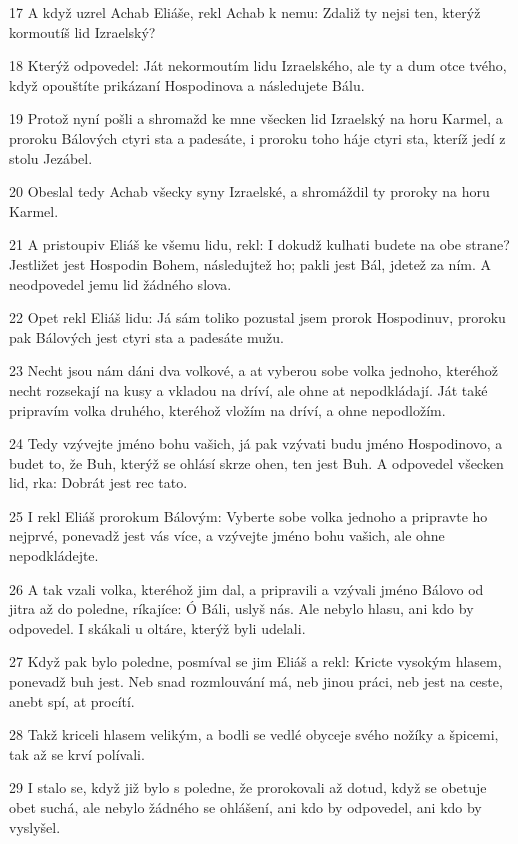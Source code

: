 \par 17 A když uzrel Achab Eliáše, rekl Achab k nemu: Zdaliž ty nejsi ten, kterýž kormoutíš lid Izraelský?
\par 18 Kterýž odpovedel: Ját nekormoutím lidu Izraelského, ale ty a dum otce tvého, když opouštíte prikázaní Hospodinova a následujete Bálu.
\par 19 Protož nyní pošli a shromažd ke mne všecken lid Izraelský na horu Karmel, a proroku Bálových ctyri sta a padesáte, i proroku toho háje ctyri sta, kteríž jedí z stolu Jezábel.
\par 20 Obeslal tedy Achab všecky syny Izraelské, a shromáždil ty proroky na horu Karmel.
\par 21 A pristoupiv Eliáš ke všemu lidu, rekl: I dokudž kulhati budete na obe strane? Jestližet jest Hospodin Bohem, následujtež ho; pakli jest Bál, jdetež za ním. A neodpovedel jemu lid žádného slova.
\par 22 Opet rekl Eliáš lidu: Já sám toliko pozustal jsem prorok Hospodinuv, proroku pak Bálových jest ctyri sta a padesáte mužu.
\par 23 Necht jsou nám dáni dva volkové, a at vyberou sobe volka jednoho, kteréhož necht rozsekají na kusy a vkladou na dríví, ale ohne at nepodkládají. Ját také pripravím volka druhého, kteréhož vložím na dríví, a ohne nepodložím.
\par 24 Tedy vzývejte jméno bohu vašich, já pak vzývati budu jméno Hospodinovo, a budet to, že Buh, kterýž se ohlásí skrze ohen, ten jest Buh. A odpovedel všecken lid, rka: Dobrát jest rec tato.
\par 25 I rekl Eliáš prorokum Bálovým: Vyberte sobe volka jednoho a pripravte ho nejprvé, ponevadž jest vás více, a vzývejte jméno bohu vašich, ale ohne nepodkládejte.
\par 26 A tak vzali volka, kteréhož jim dal, a pripravili a vzývali jméno Bálovo od jitra až do poledne, ríkajíce: Ó Báli, uslyš nás. Ale nebylo hlasu, ani kdo by odpovedel. I skákali u oltáre, kterýž byli udelali.
\par 27 Když pak bylo poledne, posmíval se jim Eliáš a rekl: Kricte vysokým hlasem, ponevadž buh jest. Neb snad rozmlouvání má, neb jinou práci, neb jest na ceste, anebt spí, at procítí.
\par 28 Takž kriceli hlasem velikým, a bodli se vedlé obyceje svého nožíky a špicemi, tak až se krví polívali.
\par 29 I stalo se, když již bylo s poledne, že prorokovali až dotud, když se obetuje obet suchá, ale nebylo žádného se ohlášení, ani kdo by odpovedel, ani kdo by vyslyšel.

